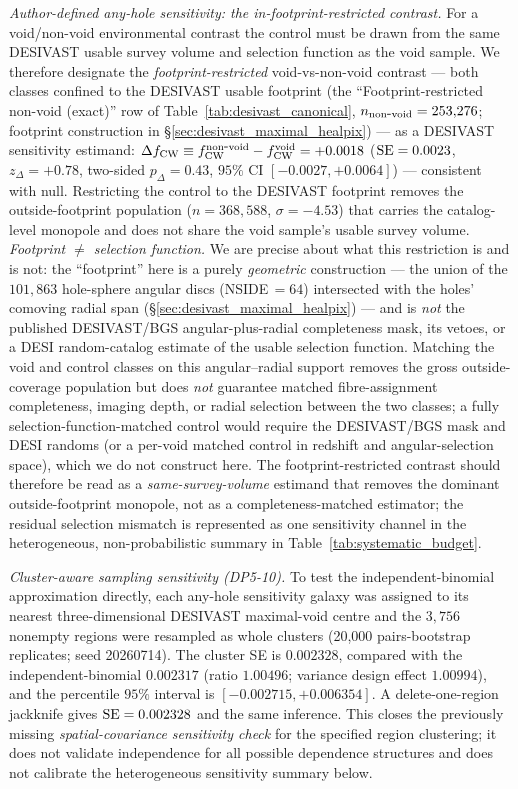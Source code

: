 \documentclass[twocolumn,linenumbers]{aastex702}
\begin{document}
\emph{Author-defined any-hole sensitivity: the in-footprint-restricted contrast.} For a
void/non-void environmental contrast the control must be drawn from the
same DESIVAST usable survey volume and selection function as the void
sample. We therefore designate the \emph{footprint-restricted}
void-vs-non-void contrast --- both classes confined to the DESIVAST
usable footprint (the ``Footprint-restricted non-void (exact)'' row of
Table~\ref{tab:desivast_canonical}, $n_{\rm non\mbox{-}void} =
253{,}276$; footprint construction in \S\ref{sec:desivast_maximal_healpix})
--- as a DESIVAST sensitivity estimand:
$\Delta f_{\rm CW} \equiv f_{\rm CW}^{\rm non\mbox{-}void}
- f_{\rm CW}^{\rm void} = +0.0018$ (${\rm SE} = 0.0023$,
$z_\Delta = +0.78$, two-sided $p_\Delta = 0.43$, $95\%$ CI
$[-0.0027, +0.0064]$) --- consistent with null. Restricting the control
to the DESIVAST footprint removes the outside-footprint population
($n = 368{,}588$, $\sigma = -4.53$) that carries the catalog-level
monopole and does not share the void sample's usable survey volume.
\emph{Footprint $\neq$ selection function.} We are precise about what
this restriction is and is not: the ``footprint'' here is a purely
\emph{geometric} construction --- the union of the $101{,}863$
hole-sphere angular discs (NSIDE\,$=\!64$) intersected with the holes'
comoving radial span (\S\ref{sec:desivast_maximal_healpix}) --- and is
\emph{not} the published DESIVAST/BGS angular-plus-radial completeness
mask, its vetoes, or a DESI random-catalog estimate of the usable
selection function. Matching the void and control classes on this
angular--radial support removes the gross outside-coverage population but
does \emph{not} guarantee matched fibre-assignment completeness, imaging
depth, or radial selection between the two classes; a fully
selection-function-matched control would require the DESIVAST/BGS mask and
DESI randoms (or a per-void matched control in redshift and
angular-selection space), which we do not construct here. The
footprint-restricted contrast should therefore be read as a
\emph{same-survey-volume} estimand that removes the dominant
outside-footprint monopole, not as a completeness-matched estimator;
the residual selection mismatch is represented as one sensitivity channel
in the heterogeneous, non-probabilistic summary in
Table~\ref{tab:systematic_budget}.

\emph{Cluster-aware sampling sensitivity (DP5-10).} To test the
independent-binomial approximation directly, each any-hole sensitivity galaxy
was assigned to its nearest three-dimensional DESIVAST maximal-void
centre and the $3{,}756$ nonempty regions were resampled as whole
clusters (20,000 pairs-bootstrap replicates; seed 20260714). The cluster
SE is $0.002328$, compared with the independent-binomial $0.002317$
(ratio $1.00496$; variance design effect $1.00994$), and the percentile
$95\%$ interval is $[-0.002715,+0.006354]$. A delete-one-region
jackknife gives ${\rm SE}=0.002328$ and the same inference. This closes
the previously missing \emph{spatial-covariance sensitivity check} for
the specified region clustering; it does not validate independence for
all possible dependence structures and does not calibrate the
heterogeneous sensitivity summary below.
\end{document}
